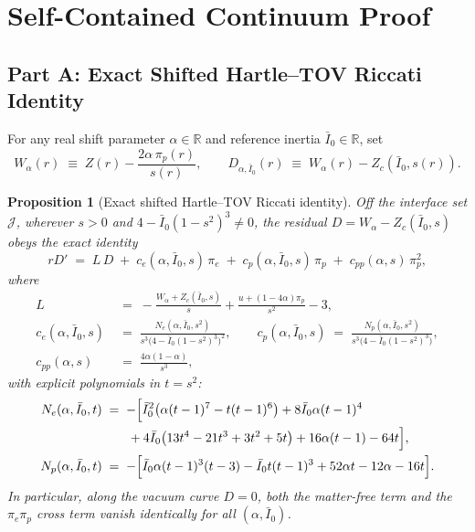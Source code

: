 \documentclass[11pt]{article}
\theoremstyle{plain}
\newtheorem{proposition}[theorem]{Proposition}
\theoremstyle{definition}
\newcommand{\R}{\mathbb{R}}
\newcommand{\Ibar}{\bar{I}}
\begin{document}
\section{Self-Contained Continuum Proof}
\label{sec:proof}

\subsection{Part A: Exact Shifted Hartle--TOV Riccati Identity}

For any real shift parameter $\alpha \in \R$ and reference inertia $\Ibar_0 \in \R$, set
\begin{equation}
  W_\alpha(r) \;\equiv\; Z(r) - \frac{2\alpha\,\pi_p(r)}{s(r)}, \qquad
  D_{\alpha,\Ibar_0}(r) \;\equiv\; W_\alpha(r) - Z_c(\Ibar_0, s(r)).
  \label{eq:W-D-def}
\end{equation}

\begin{proposition}[Exact shifted Hartle--TOV Riccati identity]
\label{prop:partA}
Off the interface set $\mathcal{J}$, wherever $s > 0$ and $4 - \Ibar_0(1 - s^2)^3 \neq 0$, the residual $D = W_\alpha - Z_c(\Ibar_0, s)$ obeys the exact identity
\begin{equation}
  r D' \;=\; L\,D \;+\; c_e(\alpha, \Ibar_0, s)\,\pi_e \;+\; c_p(\alpha, \Ibar_0, s)\,\pi_p \;+\; c_{pp}(\alpha, s)\,\pi_p^2,
  \label{eq:partA}
\end{equation}
where
\begin{align}
  L &\;=\; -\frac{W_\alpha + Z_c(\Ibar_0, s)}{s} + \frac{u + (1 - 4\alpha)\pi_p}{s^2} - 3, \label{eq:L-def} \\
  c_e(\alpha, \Ibar_0, s) &\;=\; \frac{N_e(\alpha, \Ibar_0, s^2)}{s^3\bigl(4 - \Ibar_0(1 - s^2)^3\bigr)^2}, \qquad
  c_p(\alpha, \Ibar_0, s) \;=\; \frac{N_p(\alpha, \Ibar_0, s^2)}{s^3\bigl(4 - \Ibar_0(1 - s^2)^3\bigr)}, \label{eq:ce-cp-def} \\
  c_{pp}(\alpha, s) &\;=\; \frac{4\alpha(1 - \alpha)}{s^3}, \label{eq:cpp-def}
\end{align}
with explicit polynomials in $t = s^2$:
\begin{align}
  N_e(\alpha, \Ibar_0, t) &\;=\; -\Bigl[
    \Ibar_0^2\bigl(\alpha(t-1)^7 - t(t-1)^6\bigr)
    + 8\Ibar_0\alpha(t-1)^4 \nonumber\\
  &\qquad + 4\Ibar_0\bigl(13 t^4 - 21 t^3 + 3 t^2 + 5 t\bigr)
    + 16\alpha(t-1) - 64 t
  \Bigr], \label{eq:NumE}\\
  N_p(\alpha, \Ibar_0, t) &\;=\; -\Bigl[
    \Ibar_0\alpha(t-1)^3(t-3) - \Ibar_0 t(t-1)^3 + 52\alpha t - 12\alpha - 16 t
  \Bigr]. \label{eq:NumP}
\end{align}
In particular, along the vacuum curve $D = 0$, both the matter-free term and the $\pi_e \pi_p$ cross term vanish identically for all $(\alpha, \Ibar_0)$.
\end{proposition}
\end{document}
